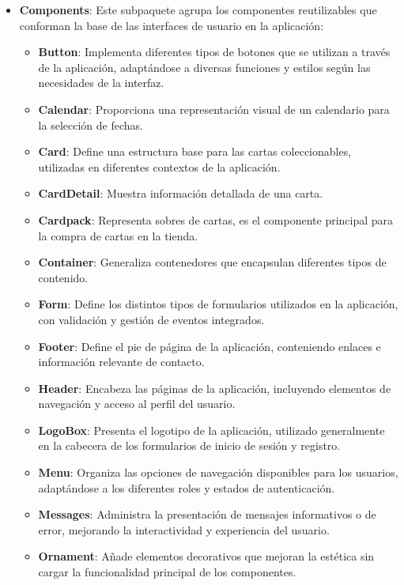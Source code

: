 \begin{itemize}
    \begin{itemize}
        \item \textbf{Components}: Este subpaquete agrupa los componentes reutilizables que conforman la base de las interfaces de usuario en la aplicación:

\begin{itemize}
    \item \textbf{Button}: Implementa diferentes tipos de botones que se utilizan a través de la aplicación, adaptándose a diversas funciones y estilos según las necesidades de la interfaz.
    \item \textbf{Calendar}: Proporciona una representación visual de un calendario para la selección de fechas.
    \item \textbf{Card}: Define una estructura base para las cartas coleccionables, utilizadas en diferentes contextos de la aplicación.
    \item \textbf{CardDetail}: Muestra información detallada de una carta.
    \item \textbf{Cardpack}: Representa sobres de cartas, es el componente principal para la compra de cartas en la tienda.
    \item \textbf{Container}: Generaliza contenedores que encapsulan diferentes tipos de contenido.
    \item \textbf{Form}: Define los distintos tipos de formularios utilizados en la aplicación, con validación y gestión de eventos integrados.
    \item \textbf{Footer}: Define el pie de página de la aplicación, conteniendo enlaces e información relevante de contacto.
    \item \textbf{Header}: Encabeza las páginas de la aplicación, incluyendo elementos de navegación y acceso al perfil del usuario.
    \item \textbf{LogoBox}: Presenta el logotipo de la aplicación, utilizado generalmente en la cabecera de los formularios de inicio de sesión y registro.
    \item \textbf{Menu}: Organiza las opciones de navegación disponibles para los usuarios, adaptándose a los diferentes roles y estados de autenticación.
    \item \textbf{Messages}: Administra la presentación de mensajes informativos o de error, mejorando la interactividad y experiencia del usuario.
    \item \textbf{Ornament}: Añade elementos decorativos que mejoran la estética sin cargar la funcionalidad principal de los componentes.

\end{itemize}
\end{itemize}
\end{itemize}
